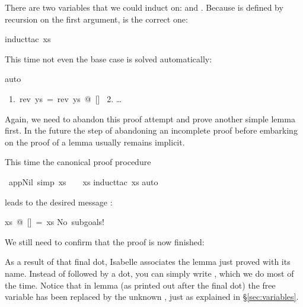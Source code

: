 \begin{isabellebody}
\begin{isamarkuptxt}
There are two variables that we could induct on:  and
. Because \isa{{\isacharat}} is defined by recursion on
the first argument,  is the correct one:%
\end{isamarkuptxt}%
induct{\isacharunderscore}tac\ xs{\isacharparenright}%
\begin{isamarkuptxt}%
\noindent
This time not even the base case is solved automatically:%
\end{isamarkuptxt}%
auto{\isacharparenright}%
\begin{isamarkuptxt}%
\begin{isabelle}
~1.~rev~ys~=~rev~ys~@~[]\isanewline
~2. \dots
\end{isabelle}
Again, we need to abandon this proof attempt and prove another simple lemma first.
In the future the step of abandoning an incomplete proof before embarking on
the proof of a lemma usually remains implicit.%
\end{isamarkuptxt}%
%
%
\begin{isamarkuptext}%
This time the canonical proof procedure%
\end{isamarkuptext}%
\ app{\isacharunderscore}Nil\ {\isacharbrackleft}simp{\isacharbrackright}{\isacharcolon}\ {\isachardoublequote}xs\ {\isacharat}\ {\isacharbrackleft}{\isacharbrackright}\ {\isacharequal}\ xs{\isachardoublequote}\isanewline
{}induct{\isacharunderscore}tac\ xs{\isacharparenright}\isanewline
{}auto{\isacharparenright}%
\begin{isamarkuptxt}%
\noindent
leads to the desired message :
\begin{isabelle}
xs~@~[]~=~xs\isanewline
No~subgoals!
\end{isabelle}

We still need to confirm that the proof is now finished:%
\end{isamarkuptxt}%
\isacommand{{\isachardot}}%
\begin{isamarkuptext}%
\noindent{}%
As a result of that final dot, Isabelle associates the lemma
just proved with its name. Instead of 
followed by a dot, you can simply write ,
which we do most of the time. Notice that in lemma 
(as printed out after the final dot) the free variable  has been
replaced by the unknown , just as explained in
\S\ref{sec:variables}.


\end{isamarkuptext}
\end{isabellebody}
